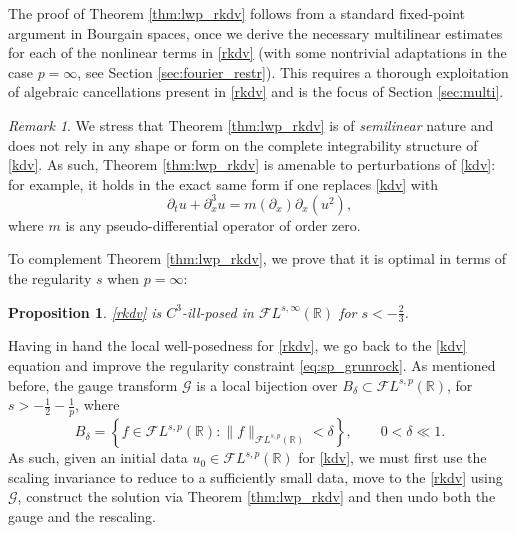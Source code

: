 \documentclass[%
11pt,  reqno]{amsart}
\newcommand{\5}{\textup{V}}
\newcommand{\noi}{\noindent}
\newcommand{\FL}{\mathcal{F} L}
\newcommand{\dx}{\partial_x}
\newcommand{\dt}{\partial_t}
\newtheorem{proposition}[theorem]{Proposition}
\theoremstyle{remark}
\newtheorem{remark}[theorem]{Remark}
\newcommand{\R}{\mathbb{R}}
\newcommand{\Gc}{\mathcal{G}}
\numberwithin{equation}{section}
\numberwithin{theorem}{section}
\newcommand{\simao}[1]{\marginpar{\color{red} $\Leftarrow\Leftarrow\Leftarrow$}{\smallskip \noi\color{red}SIMAO: #1}\smallskip}
\begin{document}
The proof of Theorem \ref{thm:lwp_rkdv} follows from a standard fixed-point argument in  Bourgain spaces,  once we derive the necessary multilinear estimates for each of the nonlinear terms in \eqref{rkdv} (with some nontrivial adaptations in the case $p=\infty$, see Section \ref{sec:fourier_restr}). This requires a thorough exploitation of algebraic cancellations present in \eqref{rkdv} and is the focus of Section \ref{sec:multi}. 

		

	\begin{remark}
		We stress that Theorem \ref{thm:lwp_rkdv} is of \emph{semilinear} nature and does not rely in any shape or form on the complete integrability structure of \eqref{kdv}. As such, Theorem \ref{thm:lwp_rkdv} is amenable to perturbations of \eqref{kdv}: for example, it holds in the exact same form if one replaces \eqref{kdv} with
		\begin{equation}
			\partial_t u + \partial_x^3 u = m(\partial_x)\partial_x(u^2),
		\end{equation}
		where $m$ is any pseudo-differential operator of order zero.
	\end{remark}



To complement Theorem \ref{thm:lwp_rkdv}, we prove that it is optimal in terms of the regularity $s$ when $p=\infty$:
    \begin{proposition}\label{prop_C3_ill}
\eqref{rkdv} is $C^3$-ill-posed in $\mathcal{F}L^{s,\infty}(\R)$ for  $s<-\frac23$.
    \end{proposition}






Having in hand the local well-posedness for \eqref{rkdv}, we go back to the \eqref{kdv} equation and improve the regularity constraint \eqref{eq:sp_grunrock}. As mentioned before, the gauge transform $\Gc$ is a local bijection over $B_\delta\subset \FL^{s,p}(\R)$, for $s>-\frac12-\frac1p$, where
$$
B_\delta=\left\{ f \in \FL^{s,p}(\R): \|f\|_{\FL^{s,p}(\R)}<\delta\right\},\qquad 0<\delta\ll 1.
$$
As such, given an initial data $u_0\in \FL^{s,p}(\R)$ for \eqref{kdv}, we must first use the scaling invariance to reduce to a sufficiently small data, move to the \eqref{rkdv} using $\Gc$, construct the solution via Theorem \ref{thm:lwp_rkdv} and then undo both the gauge and the rescaling.
\end{document}
